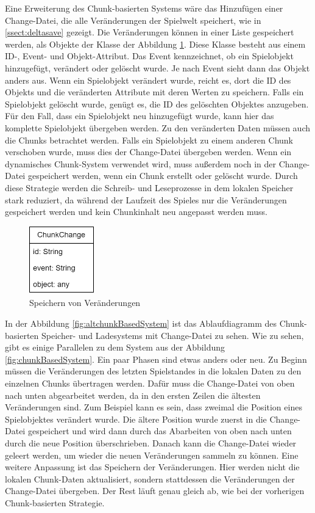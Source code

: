 Eine Erweiterung des Chunk-basierten Systems wäre das Hinzufügen einer Change-Datei, die alle Veränderungen der Spielwelt speichert, wie in \ref{ssect:deltasave} gezeigt. Die Veränderungen können in einer Liste gespeichert werden, als Objekte der Klasse der Abbildung \ref{fig:changesClass}. Diese Klasse besteht aus einem ID-, Event- und Objekt-Attribut. Das Event kennzeichnet, ob ein Spielobjekt hinzugefügt, verändert oder gelöscht wurde. Je nach Event sieht dann das Objekt anders aus. Wenn ein Spielobjekt verändert wurde, reicht es, dort die ID des Objekts und die veränderten Attribute mit deren Werten zu speichern. Falls ein Spielobjekt gelöscht wurde, genügt es, die ID des gelöschten Objektes anzugeben. Für den Fall, dass ein Spielobjekt neu hinzugefügt wurde, kann hier das komplette Spielobjekt übergeben werden. Zu den veränderten Daten müssen auch die Chunks betrachtet werden. Falls ein Spielobjekt zu einem anderen Chunk verschoben wurde, muss dies der Change-Datei übergeben werden. Wenn ein dynamisches Chunk-System verwendet wird, muss außerdem noch in der Change-Datei gespeichert werden, wenn ein Chunk erstellt oder gelöscht wurde. Durch diese Strategie werden die Schreib- und Leseprozesse in dem lokalen Speicher stark reduziert, da während der Laufzeit des Spieles nur die Veränderungen gespeichert werden und kein Chunkinhalt neu angepasst werden muss.

\begin{figure}[htp]
    \centering
    \includegraphics[width=0.25\textwidth]{images/Changes.png}
    \caption{Speichern von Veränderungen}
    \label{fig:changesClass}
\end{figure}

In der Abbildung \ref{fig:altchunkBasedSystem} ist das Ablaufdiagramm des Chunk-basierten Speicher- und Ladesystems mit Change-Datei zu sehen. Wie zu sehen, gibt es einige Parallelen zu dem System aus der Abbildung \ref{fig:chunkBasedSystem}. Ein paar Phasen sind etwas anders oder neu. Zu Beginn müssen die Veränderungen des letzten Spielstandes in die lokalen Daten zu den einzelnen Chunks übertragen werden. Dafür muss die Change-Datei von oben nach unten abgearbeitet werden, da in den ersten Zeilen die ältesten Veränderungen sind. Zum Beispiel kann es sein, dass zweimal die Position eines Spielobjektes verändert wurde. Die ältere Position wurde zuerst in die Change-Datei gespeichert und wird dann durch das Abarbeiten von oben nach unten durch die neue Position überschrieben. Danach kann die Change-Datei wieder geleert werden, um wieder die neuen Veränderungen sammeln zu können. Eine weitere Anpassung ist das Speichern der Veränderungen. Hier werden nicht die lokalen Chunk-Daten aktualisiert, sondern stattdessen die Veränderungen der Change-Datei übergeben. Der Rest läuft genau gleich ab, wie bei der vorherigen Chunk-basierten Strategie.

